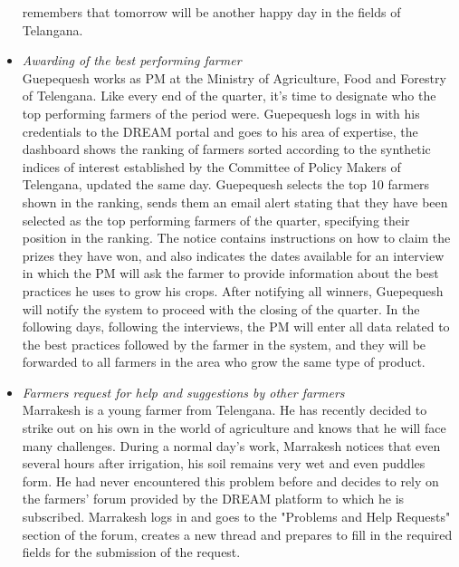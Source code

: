 \documentclass[10pt]{article}
\begin{document}
\begin{itemize}
    remembers that tomorrow will be another happy day in the fields of Telangana.
    \item \textit{Awarding of the best performing farmer}\\
    Guepequesh works as PM at the Ministry of Agriculture, Food and Forestry of Telengana. Like every end of the quarter,
     it's time to designate who the top performing farmers of the period were. Guepequesh logs in with his credentials to
      the DREAM portal and goes to his area of expertise, the dashboard shows the ranking of farmers sorted according to 
      the synthetic indices of interest established by the Committee of Policy Makers of Telengana, updated the same day. 
      Guepequesh selects the top 10 farmers shown in the ranking, sends them an email alert stating that they have been 
      selected as the top performing farmers of the quarter, specifying their position in the ranking. The notice contains 
      instructions on how to claim the prizes they have won, and also indicates the dates available for an interview in which 
      the PM will ask the farmer to provide information about the best practices he uses to grow his crops. After notifying 
      all winners, Guepequesh will notify the system to proceed with the closing of the quarter. In the following days, 
      following the interviews, the PM will enter all data related to the best practices followed by the farmer in the system, 
      and they will be forwarded to all farmers in the area who grow the same type of product. 
      \item \textit{Farmers request for help and suggestions by other farmers}\\
      Marrakesh is a young farmer from Telengana. He has recently decided to strike out on his own in the world of agriculture 
      and knows that he will face many challenges. During a normal day's work, Marrakesh notices that even several hours after irrigation, 
      his soil remains very wet and even puddles form. He had never encountered this problem before and decides to rely on the 
      farmers' forum provided by the DREAM platform to which he is subscribed. Marrakesh logs in and goes to the "Problems and Help Requests" 
      section of the forum, creates a new thread and prepares to fill in the required fields for the submission of the request. 

\end{itemize}
\end{document}
